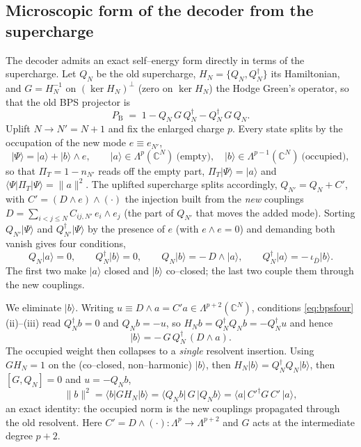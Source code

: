 \documentclass[11pt]{article}
\newcommand{\ket}[1]{\lvert #1\rangle}
\newcommand{\bra}[1]{\langle #1\rvert}
\newcommand{\PB}{P_{\mathrm B}}
\newcommand{\PiT}{\Pi_T}
\newcommand{\dg}{^{\dagger}}
\begin{document}
\subsection{Microscopic form of the decoder from the supercharge}
\label{sec:micro}
The decoder admits an exact self--energy form directly in terms of the supercharge. Let $Q_N$ be the
old supercharge, $H_N=\{Q_N,Q_N\dg\}$ its Hamiltonian, and $G=H_N^{-1}$ on $(\ker H_N)^\perp$ (zero on
$\ker H_N$) the Hodge Green's operator, so that the old BPS projector is
\begin{equation}
  \PB \;=\; 1 - Q_N\,G\,Q_N\dg - Q_N\dg\,G\,Q_N .
  \label{eq:PB}
\end{equation}
Uplift $N\to N'=N+1$ and fix the enlarged charge $p$. Every state splits by the occupation of the new
mode $e\equiv e_{N'}$,
\begin{equation}
  \ket\Psi=\ket a+\ket b\wedge e,\qquad
  \ket a\in\Lambda^{p}(\mathbb C^{N})\ \text{(empty)},\quad
  \ket b\in\Lambda^{p-1}(\mathbb C^{N})\ \text{(occupied)},
  \label{eq:absplit}
\end{equation}
so that $\PiT=1-n_{N'}$ reads off the empty part, $\PiT\ket\Psi=\ket a$ and $\bra\Psi\PiT\ket\Psi=\|a\|^2$.
The uplifted supercharge splits accordingly, $Q_{N'}=Q_N+C'$, with $C'=(D\wedge e)\wedge(\cdot)$ the
injection built from the \emph{new} couplings $D=\sum_{i<j\le N}C_{ij,N'}\,e_i\wedge e_j$ (the part of
$Q_{N'}$ that moves the added mode). Sorting $Q_{N'}\ket\Psi$ and $Q_{N'}\dg\ket\Psi$ by the presence of
$e$ (with $e\wedge e=0$) and demanding both vanish gives four conditions,
\begin{equation}
  Q_N\ket a=0,\qquad Q_N\dg\ket b=0,\qquad Q_N\ket b=-\,D\wedge\ket a,\qquad Q_N\dg\ket a=-\,\iota_{\bar D}\ket b .
  \label{eq:bpsfour}
\end{equation}
The first two make $\ket a$ closed and $\ket b$ co--closed; the last two couple them through the new
couplings.

We eliminate $\ket b$. Writing $u\equiv D\wedge a=C'a\in\Lambda^{p+2}(\mathbb C^N)$, conditions
\eqref{eq:bpsfour}(ii)--(iii) read $Q_N\dg b=0$ and $Q_N b=-u$, so
$H_N b=Q_N\dg Q_N b=-Q_N\dg u$ and hence
\begin{equation}
  \ket b=-\,G\,Q_N\dg\,(D\wedge a).
  \label{eq:belim}
\end{equation}
The occupied weight then collapses to a \emph{single} resolvent insertion. Using $GH_N=1$ on the
(co--closed, non--harmonic) $\ket b$, then $H_N\ket b=Q_N\dg Q_N\ket b$, then $[G,Q_N]=0$ and $u=-Q_Nb$,
\begin{equation}
  \|b\|^2=\bra b G H_N\ket b=\bra{Q_N b}\,G\,\ket{Q_N b}=\bra a\,{C'}\dg G\,C'\,\ket a ,
  \label{eq:selfnorm}
\end{equation}
an exact identity: the occupied norm is the new couplings propagated through the old resolvent. Here
$C'=D\wedge(\cdot):\Lambda^p\to\Lambda^{p+2}$ and $G$ acts at the intermediate degree $p+2$.
\end{document}
